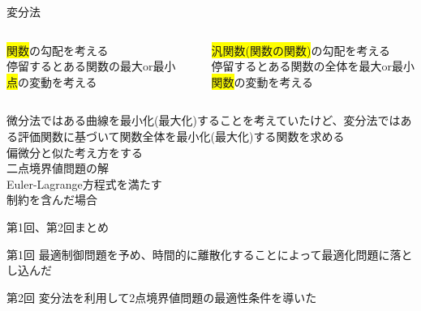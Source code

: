 \documentclass[dvipdfmx,12pt]{beamer}
\begin{document}
    \begin{frame}{変分法}
        \scriptsize

        \begin{columns}
            \begin{column}{.4\textwidth}
                \begin{tcolorbox}[title=微分法]
                    \colorbox{yellow}{関数}の勾配を考える\\
                    停留するとある関数の最大or最小 \\
                    \colorbox{yellow}{点}の変動を考える\\
                \end{tcolorbox}
            \end{column}
            \begin{column}{.2\textwidth}
            \end{column}
            \begin{column}{.4\textwidth}
                \begin{tcolorbox}[title=変分法]
                    \colorbox{yellow}{汎関数(関数の関数)}の勾配を考える\\
                    停留するとある関数の全体を最大or最小\\ 
                    \colorbox{yellow}{関数}の変動を考える\\
                \end{tcolorbox}
            \end{column}
        \end{columns}

        微分法ではある曲線を最小化(最大化)することを考えていたけど、変分法ではある評価関数に基づいて関数全体を最小化(最大化)する関数を求める \\
        
        偏微分と似た考え方をする \\

        二点境界値問題の解 \\
        Euler-Lagrange方程式を満たす \\
        制約を含んだ場合 \\
    \end{frame}

    \begin{frame}{第1回、第2回まとめ}
        \begin{itembox}[l]{第1回}
            最適制御問題を予め、時間的に離散化することによって最適化問題に落とし込んだ
        \end{itembox}
        \begin{itembox}[l]{第2回}
            変分法を利用して2点境界値問題の最適性条件を導いた
        \end{itembox}
    \end{frame}
\end{document}
